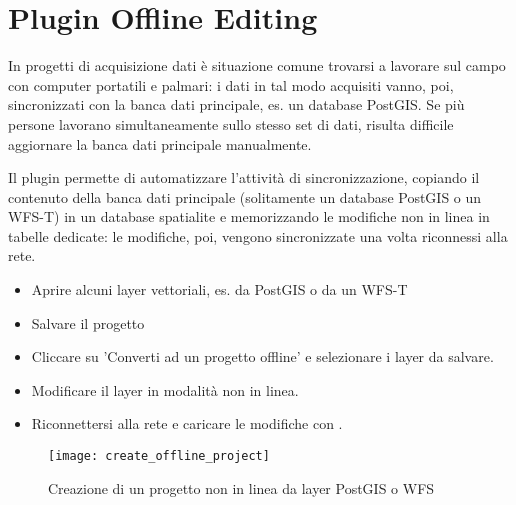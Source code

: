 
\section{Plugin Offline Editing}\label{sec:offlinedit}


In progetti di acquisizione dati è situazione comune trovarsi a lavorare sul 
campo con computer portatili e palmari: i dati in tal modo acquisiti vanno, poi, 
sincronizzati con la banca dati principale, es. un database PostGIS.
Se più persone lavorano simultaneamente sullo stesso set di dati, risulta 
difficile aggiornare la banca dati principale manualmente.

Il plugin  permette di automatizzare 
l'attività di sincronizzazione, copiando il contenuto della banca dati principale 
(solitamente un database PostGIS o un WFS-T) in un database spatialite e memorizzando 
le modifiche non in linea in tabelle dedicate: le modifiche, poi, vengono sincronizzate una 
volta riconnessi alla rete.


\begin{itemize}
\item Aprire alcuni layer vettoriali, es. da PostGIS o da un WFS-T
\item Salvare il progetto
\item Cliccare su 'Converti ad un progetto offline' e selezionare i layer da salvare. 
\item Modificare il layer in modalità non in linea.
\item Riconnettersi alla rete e caricare le modifiche con .
\end{itemize}

\begin{figure}[ht]
   \centering
   \texttt{[image: create\_offline\_project]}   
   \caption{Creazione di un progetto non in linea da layer PostGIS o WFS \wincaption}
   \label{fig:offlineproject}
\end{figure}

\FloatBarrier
